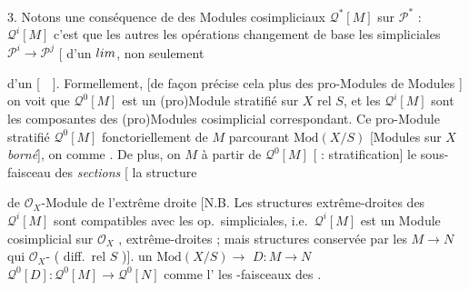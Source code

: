 \documentclass[11pt,a4paper]{article}
\begin{document}
3. Notons une conséquence  \ill{} de \ill{} des Modules
cosimpliciaux \ill{} $\mathcal{Q}^{*}[M]$ sur $\mathcal{P}^{*}$ : \struck{\ill{}}
\ill{} \ill{} $\mathcal{Q}^{i}[M]$ \ill{} \struck{\ill{}} c'est que les
\ill{} \ill{} \ill{} autres \ill{} \ill{} \ill{} \ill{} les opérations
\ill{} \ill{} changement de base \ill{} les 
simpliciales $\mathcal{P}^{i} \to \mathcal{P}^{j}$ [\ill{} \ill{} \ill{}
\struck{\ill{}} \ill{} \ill{} d'un $\varprojlim$, non seulement


d'un [~~]. Formellement, [de façon précise \ill{} cela plus \ill{} \ill{}
des pro-Modules \ill{} \ill{} de Modules \ill{} \ill{}] on voit que
$\mathcal{Q}^{0}[M]$ est un (pro)Module stratifié sur $X$ rel $S$, et les
$\mathcal{Q}^{i}[M]$ sont les composantes des (pro)Modules \struck{\ill{}}
cosimplicial correspondant.\marginal{\ill{} \ill{} \ill{}}
Ce pro-Module stratifié $\mathcal{Q}^{0}[M]$ \ill{} \ill{} fonctoriellement
de $M$ parcourant $\mathrm{Mod}(X/S)$ [Modules sur $X$ \ill{}
 \ill{} \emph{ borné}], on
\ill{} \ill{} \ill{} \ill{} \ill{} comme \ill{} \ill{} \ill{}
. De plus, on  $M$ à partir de
$\mathcal{Q}^{0}[M]$ [\ill{} : stratification] \ill{} \ill{} \ill{} \ill{}
le sous-faisceau des \emph{sections \ill{}} [\ill{} la
structure


de $\mathcal{O}_X$-Module \ill{} de l'extrême droite [N.B. Les structures
extrême-droites des $\mathcal{Q}^{i}[M]$ sont compatibles avec les op.\
simpliciales, i.e.\ $\mathcal{Q}^{i}[M]$ est un Module cosimplicial sur
$\mathcal{O}_X$ \ill{} \ill{}, \ill{} \ill{} \ill{} extrême-droites ; mais
\ill{} \ill{} \ill{} \ill{} \ill{} structures \ill{} \ill{} \ill{}
conservée par les \ill{} $M \to N$ qui \ill{} \ill{} $\mathcal{O}_X$-\ill{}
(\ill{} \ill{} \ill{} \ill{} diff.\ rel $S$ \ill{})]. \ill{} \ill{} un
\ill{} $\mathrm{Mod}(X/S) \to$ \ill{} $D : M \to N$ \ill{}
$\mathcal{Q}^{0}[D] : \mathcal{Q}^{0}[M] \to \mathcal{Q}^{0}[N]$ \ill{}
\ill{} \ill{} \ill{} comme l'\ill{} \ill{} \ill{} les
-faisceaux des \struck{\ill{}} 
.
\end{document}
